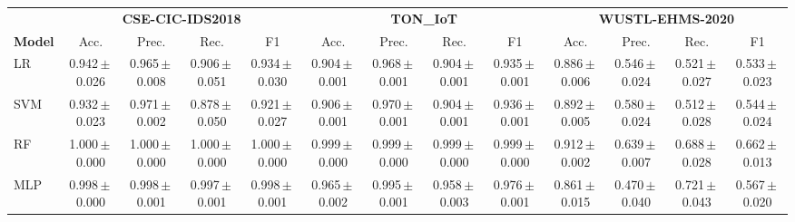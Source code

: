 \begin{tabular}{lcccccccccccc}
\toprule
 & \multicolumn{4}{c}{\textbf{CSE-CIC-IDS2018}} & \multicolumn{4}{c}{\textbf{TON\_IoT}} & \multicolumn{4}{c}{\textbf{WUSTL-EHMS-2020}} \\
\cmidrule(lr){2-5}\cmidrule(lr){6-9}\cmidrule(lr){10-13}
\textbf{Model} & Acc. & Prec. & Rec. & F1 & Acc. & Prec. & Rec. & F1 & Acc. & Prec. & Rec. & F1 \\
\midrule
LR & 0.942\,$\pm$\,0.026 & 0.965\,$\pm$\,0.008 & 0.906\,$\pm$\,0.051 & 0.934\,$\pm$\,0.030 & 0.904\,$\pm$\,0.001 & 0.968\,$\pm$\,0.001 & 0.904\,$\pm$\,0.001 & 0.935\,$\pm$\,0.001 & 0.886\,$\pm$\,0.006 & 0.546\,$\pm$\,0.024 & 0.521\,$\pm$\,0.027 & 0.533\,$\pm$\,0.023 \\
SVM & 0.932\,$\pm$\,0.023 & 0.971\,$\pm$\,0.002 & 0.878\,$\pm$\,0.050 & 0.921\,$\pm$\,0.027 & 0.906\,$\pm$\,0.001 & 0.970\,$\pm$\,0.001 & 0.904\,$\pm$\,0.001 & 0.936\,$\pm$\,0.001 & 0.892\,$\pm$\,0.005 & 0.580\,$\pm$\,0.024 & 0.512\,$\pm$\,0.028 & 0.544\,$\pm$\,0.024 \\
RF & 1.000\,$\pm$\,0.000 & 1.000\,$\pm$\,0.000 & 1.000\,$\pm$\,0.000 & 1.000\,$\pm$\,0.000 & 0.999\,$\pm$\,0.000 & 0.999\,$\pm$\,0.000 & 0.999\,$\pm$\,0.000 & 0.999\,$\pm$\,0.000 & 0.912\,$\pm$\,0.002 & 0.639\,$\pm$\,0.007 & 0.688\,$\pm$\,0.028 & 0.662\,$\pm$\,0.013 \\
MLP & 0.998\,$\pm$\,0.000 & 0.998\,$\pm$\,0.001 & 0.997\,$\pm$\,0.001 & 0.998\,$\pm$\,0.001 & 0.965\,$\pm$\,0.002 & 0.995\,$\pm$\,0.001 & 0.958\,$\pm$\,0.003 & 0.976\,$\pm$\,0.001 & 0.861\,$\pm$\,0.015 & 0.470\,$\pm$\,0.040 & 0.721\,$\pm$\,0.043 & 0.567\,$\pm$\,0.020 \\
\bottomrule
\end{tabular}